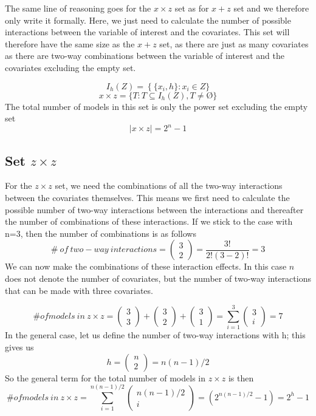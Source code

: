 The same line of reasoning goes for the $x \times z$ set as for $x + z$ set and we therefore only write it formally. Here, we just need to calculate the number of possible interactions between the variable of interest and the covariates. This set will therefore have the same size as the $x + z$ set, as there are just as many covariates as there are two-way combinations between the variable of interest and the covariates excluding the empty set.

\[I_h(Z)=\left.\left\{\{x_i,h\}\right.:x_i\in Z\right.\}\] 
\[x \times z=\left.\{T:T\subseteq I_h\left(Z\right),T\neq \textrm{\O}\right.\}\] 
The total number of models in this set is only the power set excluding the empty set
\[\left|x \times z\right|\boldsymbol{=}2^n-1\] 

\subsection{Set $z \times z$}

For the $z \times z$ set, we need the combinations of all the two-way interactions between the covariates themselves. This means we first need to calculate the possible number of two-way interactions between the interactions and thereafter the number of combinations of these interactions. If we stick to the case with n=3, then the number of combinations is as follows
\[\#\ of\ two-way\ interactions=\left( \begin{array}{c}
3 \\ 
2 \end{array}
\right)=\frac{3!}{2!\left(3-2\right)!}=3\] 
We can now make the combinations of these interaction effects. In this case $n$ does not denote the number of covariates, but the number of two-way interactions that can be made with three covariates.  

\noindent 
\[\# of models\ in\ z \times z=\left( \begin{array}{c}
3 \\ 
3 \end{array}
\right)+\left( \begin{array}{c}
3 \\ 
2 \end{array}
\right)+\left( \begin{array}{c}
3 \\ 
1 \end{array}
\right)=\sum^3_{i=1}{\left( \begin{array}{c}
3 \\ 
i \end{array}
\right)}=7\] 
In the general case, let us define the number of two-way interactions with h; this gives us
\[h=\left( \begin{array}{c}
n \\ 
2 \end{array}
\right)=n(n-1)/2\] 
So the general term for the total number of models in $z \times z$ is then
\[\# of models\ in\ z \times z=\sum^{n(n-1)/2}_{i=1}{\left( \begin{array}{c}
n(n-1)/2 \\ 
i \end{array}
\right)}=(2^{n(n-1)/2}-1)=2^h-1\] 


